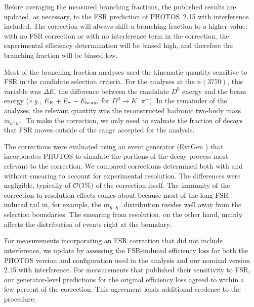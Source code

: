 Before averaging the measured branching fractions, the published 
results are updated, as necessary, to the FSR prediction of 
PHOTOS~2.15 with interference included.  The correction will 
always shift a branching fraction to a higher value: with no 
FSR correction or with no interference term in the correction, 
the experimental efficiency determination will be biased high, 
and therefore the branching fraction will be biased low.

Most of the branching fraction analyses used the kinematic quantity 
sensitive to FSR in the candidate selection criteria.  For the 
analyses at the $\psi(3770)$, this variable was $\Delta E$, the 
difference between the candidate $D^0$ energy and the beam energy 
({\em e.g.}, $E_K + E_\pi - E_{\rm beam}$ for $D^0\to K^-\pi^+$).  
In the remainder of the analyses, the relevant quantity was the 
reconstructed hadronic two-body mass $m_{h^+h^-}$.  To make the 
correction, 
we  only need to evaluate the fraction of decays that FSR moves 
outside of the range accepted for the analysis.  

The corrections were evaluated using an event generator (EvtGen 
\cite{Ryd:2005zz}) that incorporates PHOTOS to simulate the 
portions of the decay process most relevant to the correction.  
We compared corrections determined both with and without smearing 
to account for experimental resolution.  The differences were 
negligible, typically of ${\cal O}(1\%)$ of the correction itself.  
The immunity of the correction to resolution effects comes about because 
most of the long FSR-induced tail in, for example, the $m_{h^+h^-}$ 
distribution resides well away from the selection boundaries.  The 
smearing from resolution, on the other hand, mainly affects the 
distribution of events right at the boundary.

For measurements incorporating an FSR correction that did not 
include interference, we update by assessing the FSR-induced 
efficiency loss for both the PHOTOS version and configuration 
used in the analysis and our nominal version 2.15 with interference.  
For measurements that published their sensitivity to FSR, our 
generator-level predictions for the original efficiency loss 
agreed to within a few percent %
of the correction. 
This agreement 
lends additional credence to the procedure.

